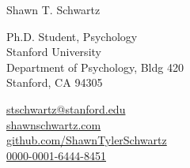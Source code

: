 {\huge Shawn T. Schwartz} %
\bigskip\medskip

Ph.D. Student, Psychology\\ %
Stanford University\\
Department of Psychology, Bldg 420\\
Stanford, CA 94305

\medskip %

 \href{mailto:stschwartz@stanford.edu}{stschwartz@stanford.edu} \\
 \href{https://shawnschwartz.com}{shawnschwartz.com} \\
 \href{https://github.com/ShawnTylerSchwartz}{github.com/ShawnTylerSchwartz} \\
 \href{https://orcid.org/0000-0001-6444-8451}{0000-0001-6444-8451}
